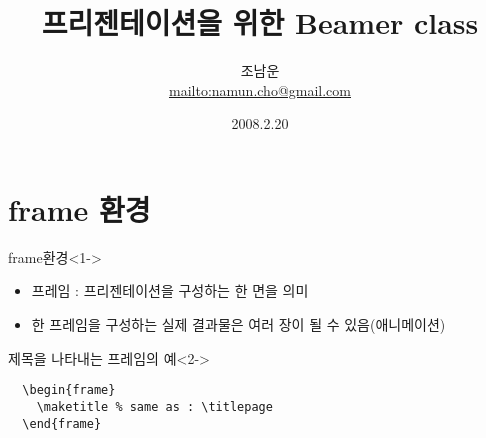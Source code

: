 \documentclass[hyperref={unicode}]{beamer}
\begin{document}
\author{조남운\\ \url{mailto:namun.cho@gmail.com}}
\title{프리젠테이션을 위한 Beamer class}
\date{2008.2.20}

\begin{frame}
  \titlepage
\end{frame}



\section{frame 환경}

\begin{frame}[fragile]
\begin{block}{frame환경}<1->
\begin{itemize}
  \item 프레임 : 프리젠테이션을 구성하는 한 면을 의미
  \item 한 프레임을 구성하는 실제 결과물은 여러 장이 될 수 있음(애니메이션)
\end{itemize}
\begin{block}{제목을 나타내는 프레임의 예}<2->
\begin{verbatim}
  \begin{frame} 
    \maketitle % same as : \titlepage
  \end{frame} 
\end{verbatim}
\end{block}
\end{block}
\end{frame}
\end{document}
